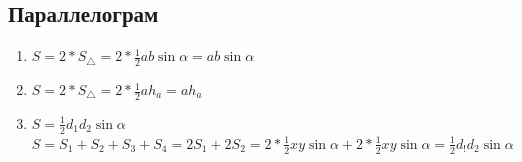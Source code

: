 \documentclass[titlepage]{article}
\begin{document}
    \subsection{Параллелограм}
        \begin{enumerate}
            \item $S=2*S_{\triangle}=2*\frac{1}{2}ab\sin\alpha= ab\sin\alpha$
            \item $S=2*S_{\triangle}=2*\frac{1}{2}ah_a=ah_a$
            \item $S =\frac{1}{2}d_1d_2\sin\alpha$\\
            $S=S_1+S_2+S_3+S_4=2S_1+2S_2=2*\frac{1}{2}xy\sin\alpha+2*\frac{1}{2}xy\sin\alpha=\frac{1}{2}d_!d_2\sin\alpha$
        \end{enumerate}
\end{document}
